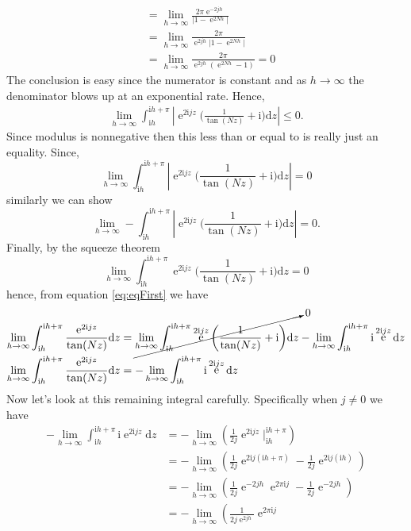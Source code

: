 \documentclass[10pt]{amsart}
\newcommand{\D}{\mathrm{d}}
\newcommand{\I}{\mathrm{i}}
\DeclareMathOperator{\E}{e}
\theoremstyle{nonumberplain}
\begin{document}
\begin{enumerate}[label={\bf {\arabic*}:}]
\begin{align*}
&= \lim_{h \to \infty} \frac{ 2 \pi \E^{- 2 j h} }{| 1 - \E^{ 2 N h} |} \\
&= \lim_{h \to \infty} \frac{ 2 \pi }{\E^{ 2 j h}| 1 - \E^{ 2 N h} |} \\
&= \lim_{h \to \infty} \frac{ 2 \pi }{\E^{ 2 j h}( \E^{ 2 N h}  - 1)} = 0
\end{align*}
The conclusion is easy since the numerator is constant and as $h \rightarrow \infty$ the denominator blows up at an exponential rate.
Hence,
\begin{align*}
\lim_{h \to \infty} \int_{\I h}^{\I h + \pi} \left| \E^{2 \I jz} \bigg( \frac 1 {\tan (N z)} + \I \bigg) \D z \right| \leq 0.
\end{align*}
Since modulus is nonnegative then this less than or equal to is really just an equality.
Since,
$$\lim_{h \to \infty} \int_{\I h}^{\I h + \pi} \left| \E^{2 \I jz} \bigg( \frac 1 {\tan (N z)} + \I \bigg) \D z \right| = 0 $$
similarly we can show
$$
\lim_{h \to \infty} - \int_{\I h}^{\I h + \pi} \left| \E^{2 \I jz} \bigg( \frac 1 {\tan (N z)} + \I \bigg) \D z \right| = 0.
$$
Finally, by the squeeze theorem
$$
\lim_{h \to \infty} \int_{\I h}^{\I h + \pi} \E^{2 \I jz} \bigg( \frac 1 {\tan (N z)} + \I \bigg) \D z  = 0
$$
hence, from equation \eqref{eq:eqFirst} we have
\begin{align*}
\lim_{h \to \infty} \int_{\I h}^{\I h + \pi} \frac{\E^{2 \I jz}}{\tan (N z)} \D z
	&= \cancelto{0}{\lim_{h \to \infty} \int_{\I h}^{\I h + \pi} \E^{2 \I jz} \bigg( \frac 1 {\tan (N z)}  + \I \bigg) \D z} - \lim_{h \to \infty} \int_{\I h}^{\I h + \pi} \I \E^{2 \I jz}   \D z \\
\lim_{h \to \infty} \int_{\I h}^{\I h + \pi} \frac{\E^{2 \I jz}}{\tan (N z)} \D z
	&= - \lim_{h \to \infty} \int_{\I h}^{\I h + \pi} \I \E^{2 \I jz}   \D z
\end{align*}
Now let's look at this remaining integral carefully.
Specifically when $j \neq 0$ we have
\begin{align*}
- \lim_{h \to \infty} \int_{\I h}^{\I h + \pi} \I \E^{2 \I jz} \D z
	&= - \lim_{h \to \infty} \left( \frac 1 {2 j } \E^{2 \I jz} \bigg|_{\I h}^{\I h + \pi}  \right) \\
	&= - \lim_{h \to \infty} \left( \frac 1 {2 j } \E^{2 \I j(\I h + \pi)} - \frac 1 {2 j } \E^{2 \I j(\I h)}  \right) \\
	&= - \lim_{h \to \infty} \left( \frac 1 {2 j } \E^{- 2 j h}\E^{2 \pi \I j}
		- \frac 1 {2 j } \E^{- 2 j h}  \right) \\
	&= - \lim_{h \to \infty} \left( \frac 1 {2 j \E^{2 j h}} \E^{2 \pi \I j}

\end{align*}
\end{enumerate}
\end{document}
